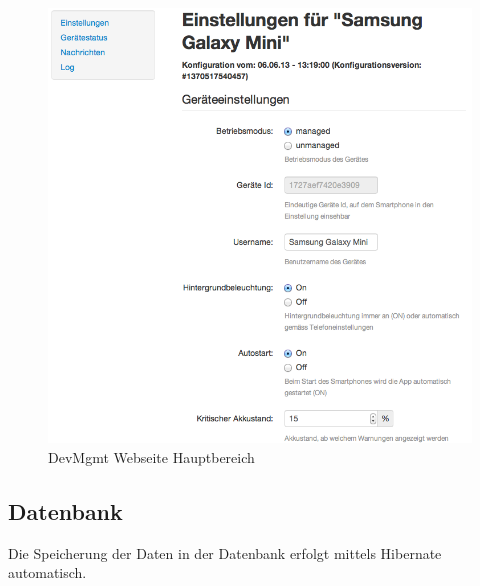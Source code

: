 \begin{figure}[H]
	\centering
	\includegraphics[width=120mm]{images/devmgmtsrv/settings.png}
	\caption{DevMgmt Webseite Hauptbereich}
\end{figure}

\subsection{Datenbank}
Die Speicherung der Daten in der Datenbank erfolgt mittels Hibernate automatisch. 
